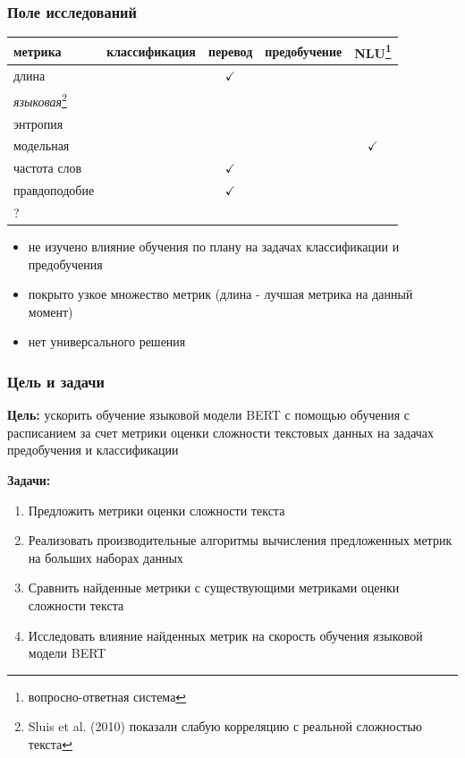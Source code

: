 \documentclass{beamer}
\begin{document}
\begin{frame}
	\frametitle{Поле исследований}
	\begin{table}
		\begin{tabular}{l|cccc}
			метрика & классификация & перевод & предобучение & NLU\footnote[1]{вопросно-ответная система} \\
			\hline
			длина & & $\checkmark$ & & \\
			{\it языковая}\footnote[2]{Sluis et al. (2010) показали слабую корреляцию с реальной сложностью текста} & & & & \\
			энтропия & & & & \\
			модельная & & & & $\checkmark$ \\
			частота слов & & $\checkmark$ & & \\
			правдоподобие & & $\checkmark$ & & \\
			\hline
			? & & & & \\
			\hline
		\end{tabular}
	\end{table}
	\begin{itemize}
		\item не изучено влияние обучения по плану на задачах классификации и предобучения
		\item покрыто узкое множество метрик (длина - лучшая метрика на данный момент)
		\item нет универсального решения
	\end{itemize}
\end{frame}

\begin{frame}
	\frametitle{Цель и задачи}
	{\bf Цель:} ускорить обучение языковой модели BERT с помощью обучения с расписанием за счет метрики оценки сложности текстовых данных на задачах предобучения и классификации
	
	{\bf Задачи:}
	\begin{enumerate}
		\item Предложить метрики оценки сложности текста
		\item Реализовать производительные алгоритмы вычисления предложенных метрик на больших наборах данных
		\item Сравнить найденные метрики с существующими метриками оценки сложности текста
		\item Исследовать влияние найденных метрик на скорость обучения языковой модели BERT
	\end{enumerate}
\end{frame}
\end{document}

